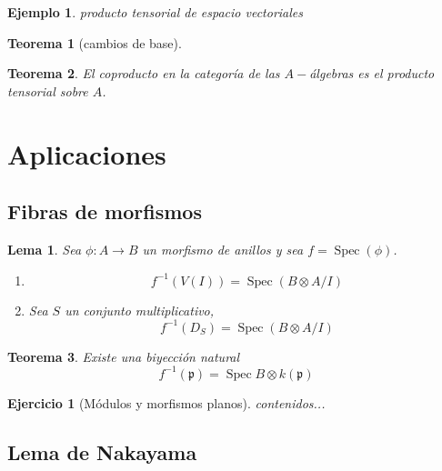 \documentclass[12pt]{book}
\newtheorem{eje}{Ejemplo}
\newtheorem{teo}{Teorema}
\newtheorem{lem}{Lema}
\newtheorem{ex}{Ejercicio}
\newcommand{\spec}{\operatorname{Spec}}
\begin{document}
\begin{eje}
producto tensorial de espacio vectoriales
\end{eje}



\begin{teo}[cambios de base]


\end{teo}






\begin{teo}
El coproducto en la categoría de las $A-$álgebras es el producto tensorial sobre $A$.
\end{teo}







\section{Aplicaciones}

\subsection{Fibras de morfismos}

\begin{lem}
Sea $\phi : A \rightarrow B$ un morfismo de anillos y sea $f = \operatorname{Spec} (\phi)$.
\begin{enumerate}
\item $$ f^{-1} (V(I)) = \operatorname{Spec} (B \otimes A/I) $$

\item Sea $S$ un conjunto multiplicativo, $$f^{-1}(D_S) = \operatorname{Spec} ( B \otimes A/I) $$


\end{enumerate}
\end{lem}

\begin{teo}
Existe una biyección natural $$ f^{-1} (\mathfrak{p}) = \spec B \otimes  k(\mathfrak{p}) $$
\end{teo}



\begin{ex}[Módulos y morfismos planos]
	contenidos...
\end{ex}


\subsection{Lema de Nakayama}
\end{document}

